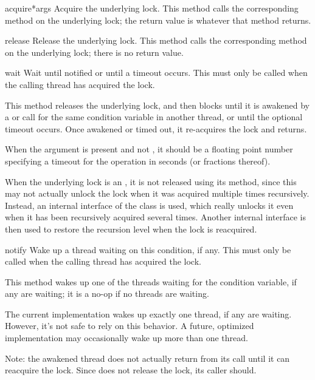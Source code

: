 \begin{methoddesc}{acquire}{*args}
Acquire the underlying lock.
This method calls the corresponding method on the underlying
lock; the return value is whatever that method returns.
\end{methoddesc}

\begin{methoddesc}{release}{}
Release the underlying lock.
This method calls the corresponding method on the underlying
lock; there is no return value.
\end{methoddesc}

\begin{methoddesc}{wait}{}
Wait until notified or until a timeout occurs.
This must only be called when the calling thread has acquired the
lock.

This method releases the underlying lock, and then blocks until it is
awakened by a  or  call for the
same condition variable in another thread, or until the optional
timeout occurs.  Once awakened or timed out, it re-acquires the lock
and returns.

When the  argument is present and not , it
should be a floating point number specifying a timeout for the
operation in seconds (or fractions thereof).

When the underlying lock is an , it is not released using
its  method, since this may not actually unlock the
lock when it was acquired multiple times recursively.  Instead, an
internal interface of the  class is used, which really
unlocks it even when it has been recursively acquired several times.
Another internal interface is then used to restore the recursion level
when the lock is reacquired.
\end{methoddesc}

\begin{methoddesc}{notify}{}
Wake up a thread waiting on this condition, if any.
This must only be called when the calling thread has acquired the
lock.

This method wakes up one of the threads waiting for the condition
variable, if any are waiting; it is a no-op if no threads are waiting.

The current implementation wakes up exactly one thread, if any are
waiting.  However, it's not safe to rely on this behavior.  A future,
optimized implementation may occasionally wake up more than one
thread.

Note: the awakened thread does not actually return from its
 call until it can reacquire the lock.  Since
 does not release the lock, its caller should.
\end{methoddesc}

